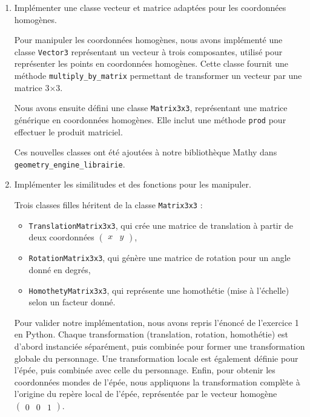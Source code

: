 \documentclass[a4paper,12pt]{article}
\begin{document}
\newpage

\label{exo:impl}
\begin{enumerate}
  \item Implémenter une classe vecteur et matrice adaptées pour les coordonnées homogènes.

Pour manipuler les coordonnées homogènes, nous avons implémenté une classe \texttt{Vector3} représentant un vecteur à trois
composantes, utilisé pour représenter les points en coordonnées homogènes. Cette classe fournit une méthode \texttt{multiply\_by\_matrix} permettant de transformer un vecteur par une matrice 3×3.

Nous avons ensuite défini une classe \texttt{Matrix3x3}, représentant une matrice générique en coordonnées homogènes. Elle inclut une méthode \texttt{prod} pour effectuer le produit matriciel. 

Ces nouvelles classes ont été ajoutées à notre bibliothèque Mathy dans \texttt{geometry\_engine\_librairie}.

  \item Implémenter les similitudes et des fonctions pour les manipuler.

Trois classes filles héritent de la classe \texttt{Matrix3x3} :
\begin{itemize}
\item \texttt{TranslationMatrix3x3}, qui crée une matrice de translation à partir de deux coordonnées $\begin{pmatrix} x & y \end{pmatrix}$,
\item \texttt{RotationMatrix3x3}, qui génère une matrice de rotation pour un angle donné en degrés,
\item \texttt{HomothetyMatrix3x3}, qui représente une homothétie (mise à l’échelle) selon un facteur donné.
\end{itemize}

Pour valider notre implémentation, nous avons repris l’énoncé de l’exercice 1 en Python. Chaque transformation (translation, rotation, homothétie) est d’abord instanciée séparément, puis combinée pour former une transformation globale du personnage. Une transformation locale est également définie pour l’épée, puis combinée avec celle du personnage. Enfin, pour obtenir les coordonnées mondes de l’épée, nous appliquons la transformation complète à l’origine du repère local de l’épée, représentée par le vecteur homogène $\begin{pmatrix} 0 & 0 & 1 \end{pmatrix}$.
\end{enumerate}
\end{document}
